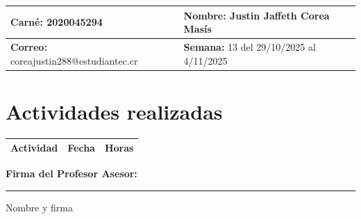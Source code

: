 \documentclass[12pt,a4paper]{article}
\begin{document}
\noindent
\begin{tabularx}{\textwidth}{|X|X|}
\hline
\textbf{Carné:} 2020045294 & \textbf{Nombre:} Justin Jaffeth Corea Masís \\
\hline
\textbf{Correo:} coreajustin288@estudiantec.cr & \textbf{Semana:} 13 del 29/10/2025 al 4/11/2025 \\
\hline
\end{tabularx}

\vspace{0.5cm}

\section*{Actividades realizadas}

\begin{tabularx}{\textwidth}{|>{\raggedright\arraybackslash}p{12cm}|c|c|}
\hline
\textbf{Actividad} & \textbf{Fecha} & \textbf{Horas} \\
\hline
\hline
\end{tabularx}

\vspace{1cm}

\noindent
\textbf{Firma del Profesor Asesor:}

\vspace{2cm}

\noindent\rule{8cm}{0.4pt}  
Nombre y firma
\end{document}
